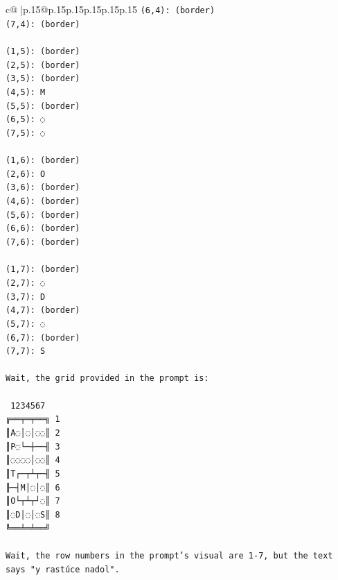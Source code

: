 \documentclass{article}
\begin{document}
{\begin{supertabular}{c@{$\;$}|p{.15\linewidth}@{}p{.15\linewidth}p{.15\linewidth}p{.15\linewidth}p{.15\linewidth}p{.15\linewidth}}
{{{\texttt{(6,4): (border)} \\
\texttt{(7,4): (border)} \\
\\ 
\texttt{(1,5): (border)} \\
\texttt{(2,5): (border)} \\
\texttt{(3,5): (border)} \\
\texttt{(4,5): M} \\
\texttt{(5,5): (border)} \\
\texttt{(6,5): ◌} \\
\texttt{(7,5): ◌} \\
\\ 
\texttt{(1,6): (border)} \\
\texttt{(2,6): O} \\
\texttt{(3,6): (border)} \\
\texttt{(4,6): (border)} \\
\texttt{(5,6): (border)} \\
\texttt{(6,6): (border)} \\
\texttt{(7,6): (border)} \\
\\ 
\texttt{(1,7): (border)} \\
\texttt{(2,7): ◌} \\
\texttt{(3,7): D} \\
\texttt{(4,7): (border)} \\
\texttt{(5,7): ◌} \\
\texttt{(6,7): (border)} \\
\texttt{(7,7): S} \\
\\ 
\texttt{Wait, the grid provided in the prompt is:} \\
\\ 
\texttt{ 1234567} \\
\texttt{╔══╤═╤══╗ 1} \\
\texttt{║A◌│◌│◌◌║ 2} \\
\texttt{║P◌└─┼──╢ 3} \\
\texttt{║◌◌◌◌│◌◌║ 4} \\
\texttt{║T┌─┬┴┬─╢ 5} \\
\texttt{╟─┤M│◌│◌║ 6} \\
\texttt{║O└┬┴┬┘◌║ 7} \\
\texttt{║◌D│◌│◌S║ 8} \\
\texttt{╚══╧═╧══╝} \\
\\ 
\texttt{Wait, the row numbers in the prompt's visual are 1{-}7, but the text says "y rastúce nadol".} \\
}}}
\end{supertabular}}
\end{document}
